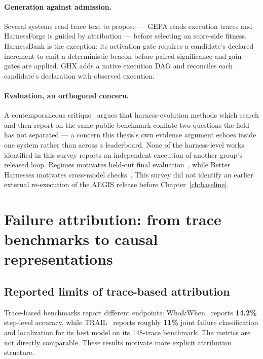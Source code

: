 \paragraph{Generation against admission.} Several systems read trace text to propose --- GEPA reads execution traces
and HarnessForge is guided by attribution --- before selecting on score-side
fitness. HarnessBank is the exception: its activation gate requires a
candidate's declared increment to emit a deterministic beacon before paired
significance and gain gates are applied. GHX adds a native execution DAG and
reconciles each candidate's declaration with observed execution.

\paragraph{Evaluation, an orthogonal concern.} A contemporaneous
critique~\cite{rethink-harness-eval} argues that harness-evolution methods
which search and then report on the same public benchmark conflate two
questions the field has not separated --- a concern this thesis's own
evidence argument echoes inside one system rather than across a
leaderboard. None of the harness-level works identified in this survey reports an
independent execution of another group's released loop. Regimes motivates
held-out final evaluation~\cite{regimes}, while Better Harnesses motivates
cross-model checks~\cite{better-harnesses}. This survey did not identify an
earlier external re-execution of the AEGIS release
before Chapter~\ref{ch:baseline}.

\section{Failure attribution: from trace benchmarks to causal representations}
\label{sec:attribution}

\subsection*{Reported limits of trace-based attribution}

Trace-based benchmarks report different endpoints: Who\&When~\cite{whowhen}
reports \textbf{14.2\%} step-level accuracy, while TRAIL~\cite{trail} reports
roughly \textbf{11\%} joint failure classification and localization for its
best model on its 148-trace benchmark. The metrics are not directly
comparable. These results motivate more explicit attribution structure.

